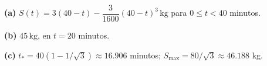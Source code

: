\noindent\textbf{(a)} $S(t)=3(40-t)-\dfrac{3}{1600}(40-t)^3\,\mathrm{kg}$ para $0\le t<40$ minutos.

\noindent\textbf{(b)} $45\,\mathrm{kg}$, en $t=20$ minutos.

\noindent\textbf{(c)} $t_*=40(1-1/\sqrt3)\approx16.906$ minutos; $S_{\max}=80/\sqrt3\approx46.188$ kg.
